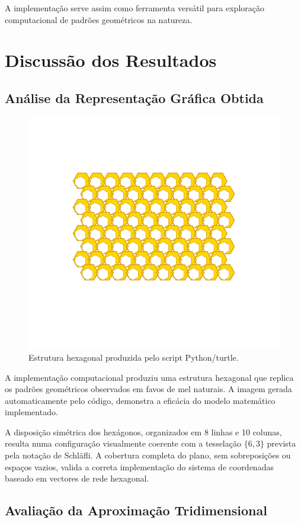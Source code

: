 \documentclass[12pt,a4paper,oneside]{extarticle}
\begin{document}
A implementação serve assim como ferramenta versátil para exploração computacional de padrões geométricos na natureza.


\section{Discussão dos Resultados}

\subsection{Análise da Representação Gráfica Obtida}


\begin{figure}[h!]
\centering
\includegraphics[width=0.8\linewidth]{produzida.png}
\caption{Estrutura hexagonal produzida pelo script Python/turtle.}
\label{fig:produzida}
\end{figure}


A implementação computacional produziu uma estrutura hexagonal que replica os padrões geométricos observados em favos de mel naturais. A imagem gerada automaticamente pelo código, demonstra a eficácia do modelo matemático implementado.

A disposição simétrica dos hexágonos, organizados em 8 linhas e 10 colunas, resulta numa configuração visualmente coerente com a tesselação $\{6,3\}$ prevista pela notação de Schläfli. A cobertura completa do plano, sem sobreposições ou espaços vazios, valida a correta implementação do sistema de coordenadas baseado em vectores de rede hexagonal.

\subsection{Avaliação da Aproximação Tridimensional}
\end{document}
